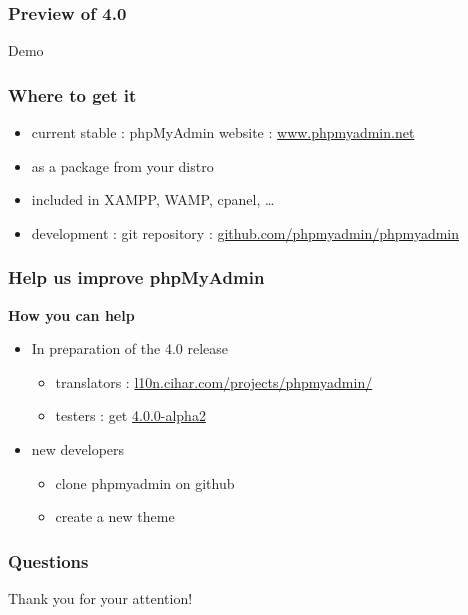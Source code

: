\documentclass[14pt]{beamer}
\begin{document}
  \begin{frame}
     \frametitle{Preview of 4.0}
     Demo
  \end{frame}
  \begin{frame}
    \frametitle{Where to get it}
    \begin{itemize}[<+->]
      \item current stable : phpMyAdmin website : \href{http://www.phpmyadmin.net/}{www.phpmyadmin.net}
      \item as a package from your distro
      \item included in XAMPP, WAMP, cpanel, \ldots
      \item development : git repository :  \href{https://github.com/phpmyadmin/phpmyadmin}{github.com/phpmyadmin/phpmyadmin}
    \end{itemize}
  \end{frame}
  \begin{frame}
  \frametitle{Help us improve phpMyAdmin}
    \textbf{{\color{PmaOlive}How you can help}}
    \pause
    \begin{itemize}[<+->]
      \item In preparation of the 4.0 release
        \begin{itemize}[<+->]
	  \item translators : \href{https://l10n.cihar.com/projects/phpmyadmin/}{l10n.cihar.com/projects/phpmyadmin/}
	  \item testers : get \href{http://www.phpmyadmin.net/}{4.0.0-alpha2}
	\end{itemize}
      \item new developers
	\begin{itemize}[<+->]
          \item clone phpmyadmin on github
          \item create a new theme
	\end{itemize}
    \end{itemize}
  \end{frame}
  \begin{frame}
  \frametitle{Questions}
    Thank you for your attention!
  \end{frame}
\end{document}
